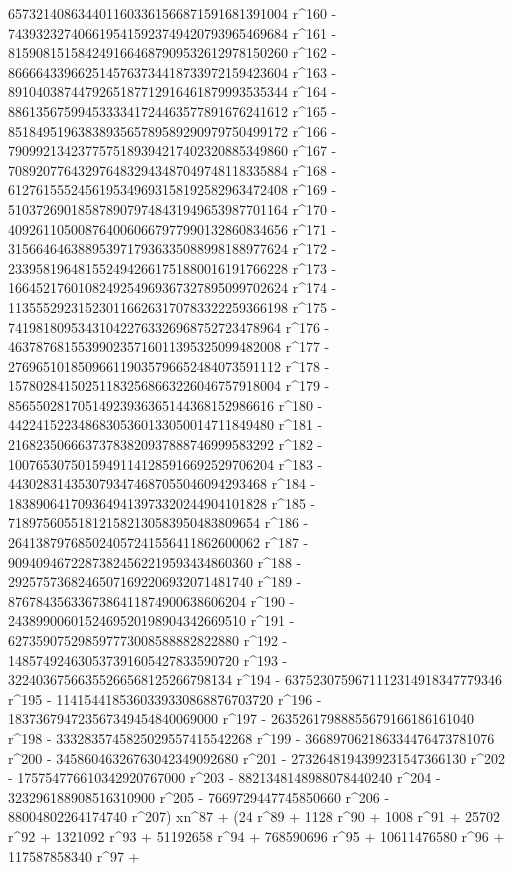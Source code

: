        6573214086344011603361566871591681391004 r^160 - 
       7439323274066195415923749420793965469684 r^161 - 
       8159081515842491664687909532612978150260 r^162 - 
       8666643396625145763734418733972159423604 r^163 - 
       8910403874479265187712916461879993535344 r^164 - 
       8861356759945333341724463577891676241612 r^165 - 
       8518495196383893565789589290979750499172 r^166 - 
       7909921342377575189394217402320885349860 r^167 - 
       7089207764329764832943487049748118335884 r^168 - 
       6127615552456195349693158192582963472408 r^169 - 
       5103726901858789079748431949653987701164 r^170 - 
       4092611050087640060667977990132860834656 r^171 - 
       3156646463889539717936335088998188977624 r^172 - 
       2339581964815524942661751880016191766228 r^173 - 
       1664521760108249254969367327895099702624 r^174 - 
       1135552923152301166263170783322259366198 r^175 - 
       741981809534310422763326968752723478964 r^176 - 
       463787681553990235716011395325099482008 r^177 - 
       276965101850966119035796652484073591112 r^178 - 
       157802841502511832568663226046757918004 r^179 - 
       85655028170514923936365144368152986616 r^180 - 
       44224152234868305360133050014711849480 r^181 - 
       21682350666373783820937888746999583292 r^182 - 
       10076530750159491141285916692529706204 r^183 - 
       4430283143530793474687055046094293468 r^184 - 
       1838906417093649413973320244904101828 r^185 - 
       718975605518121582130583950483809654 r^186 - 
       264138797685024057241556411862600062 r^187 - 
       90940946722873824562219593434860360 r^188 - 
       29257573682465071692206932071481740 r^189 - 
       8767843563367386411874900638606204 r^190 - 
       2438990060152469520198904342669510 r^191 - 
       627359075298597773008588882822880 r^192 - 
       148574924630537391605427833590720 r^193 - 
       32240367566355266568125266798134 r^194 - 
       6375230759671112314918347779346 r^195 - 
       1141544185360339330868876703720 r^196 - 
       183736794723567349454840069000 r^197 - 
       26352617988855679166186161040 r^198 - 
       3332835745825029557415542268 r^199 - 
       366897062186334476473781076 r^200 - 
       34586046326763042349092680 r^201 - 
       2732648194399231547366130 r^202 - 
       175754776610342920767000 r^203 - 
       8821348148988078440240 r^204 - 323296188908516310900 r^205 - 
       7669729447745850660 r^206 - 
       88004802264174740 r^207) xn^87 + (24 r^89 + 1128 r^90 + 
       1008 r^91 + 25702 r^92 + 1321092 r^93 + 51192658 r^94 + 
       768590696 r^95 + 10611476580 r^96 + 117587858340 r^97 + 
